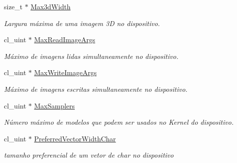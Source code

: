 \begin{DoxyCompactItemize}
\hypertarget{structdevices_ab44a9760cf2dc77618720a2a5828e8e9}{}\label{structdevices_ab44a9760cf2dc77618720a2a5828e8e9} 
size\+\_\+t $\ast$ \hyperlink{structdevices_ab44a9760cf2dc77618720a2a5828e8e9}{Max3d\+Width}
\begin{DoxyCompactList}\small\item\em Largura máxima de uma imagem 3D no dispositivo. \end{DoxyCompactList}\item 
\hypertarget{structdevices_af060538b760d37d69f1e5995af4928d9}{}\label{structdevices_af060538b760d37d69f1e5995af4928d9} 
cl\+\_\+uint $\ast$ \hyperlink{structdevices_af060538b760d37d69f1e5995af4928d9}{Max\+Read\+Image\+Args}
\begin{DoxyCompactList}\small\item\em Máximo de imagens lidas simultaneamente no dispositivo. \end{DoxyCompactList}\item 
\hypertarget{structdevices_accf0de8457f8fdb7b72b6e2103c79cd4}{}\label{structdevices_accf0de8457f8fdb7b72b6e2103c79cd4} 
cl\+\_\+uint $\ast$ \hyperlink{structdevices_accf0de8457f8fdb7b72b6e2103c79cd4}{Max\+Write\+Image\+Args}
\begin{DoxyCompactList}\small\item\em Máximo de imagens escritas simultaneamente no dispositivo. \end{DoxyCompactList}\item 
\hypertarget{structdevices_a9a25cdc63c37597479a8863ffc94440c}{}\label{structdevices_a9a25cdc63c37597479a8863ffc94440c} 
cl\+\_\+uint $\ast$ \hyperlink{structdevices_a9a25cdc63c37597479a8863ffc94440c}{Max\+Samplers}
\begin{DoxyCompactList}\small\item\em Número máximo de modelos que podem ser usados no Kernel do dispositivo. \end{DoxyCompactList}\item 
\hypertarget{structdevices_a0cf0b0ac0fe1535afc27d9fe2149d354}{}\label{structdevices_a0cf0b0ac0fe1535afc27d9fe2149d354} 
cl\+\_\+uint $\ast$ \hyperlink{structdevices_a0cf0b0ac0fe1535afc27d9fe2149d354}{Preferred\+Vector\+Width\+Char}
\begin{DoxyCompactList}\small\item\em tamanho preferencial de um vetor de char no dispositivo \end{DoxyCompactList}\item 
\hypertarget{structdevices_a8487ae555d79b9b78bbfd7b76e2f90d1}{}\label{structdevices_a8487ae555d79b9b78bbfd7b76e2f90d1} 

\end{DoxyCompactItemize}
